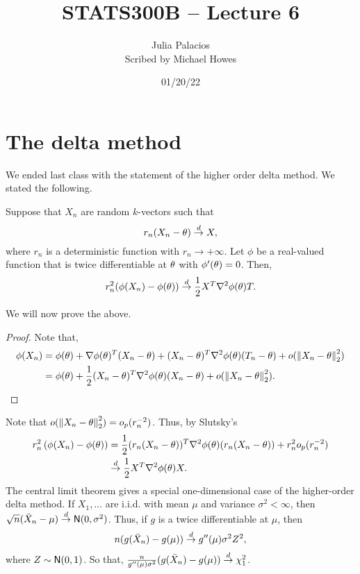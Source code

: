 




\title{STATS300B -- Lecture 6}
\author{Julia Palacios\\ Scribed by Michael Howes}
\date{01/20/22}

\pagestyle{fancy}
\fancyhf{}


\maketitle
\tableofcontents
\section{The delta method}
We ended last class with the statement of the higher order delta method. We stated the following.
\begin{theorem}
    Suppose that $X_n$ are random $k$-vectors such that 
    \[r_n(X_n-{\theta}) \stackrel{d}{\to} X, \]
    where $r_n$ is a deterministic function with $r_n \to +\infty$. Let $\phi$ be a real-valued function that is twice differentiable at ${\theta}$ with $\phi'({\theta})=0$. Then,
    \[r_n^2(\phi(X_n)-\phi({\theta})) \stackrel{d}{\to} \frac{1}{2}X^T\nabla^2\phi({\theta})T.\]
\end{theorem}
We will now prove the above.
\begin{proof}
    Note that,
    \begin{align*}
        \phi(X_n) &=\phi({\theta})+\nabla \phi({\theta})^T(X_n-{\theta}) + (X_n-{\theta})^T\nabla^2 \phi({\theta})(T_n-{\theta})+o(\left\|X_n-{\theta}\right\|_2^2)\\
        &=\phi({\theta}) + \frac{1}{2}(X_n-{\theta})^T\nabla^2 \phi({\theta})(X_n-{\theta})+o(\left\|X_n-{\theta}\right\|_2^2).
    \end{align*}
\end{proof}
Note that $o(\left\|X_n-{\theta}\right\|_2^2) = o_p(r_n^{-2})$. Thus, by Slutsky's
\begin{align*}
    r_n^2\left(\phi(X_n)-\phi({\theta})\right)&=\frac{1}{2}(r_n(X_n-{\theta}))^T\nabla^2 \phi({\theta})(r_n(X_n-{\theta}))+r_n^2o_p(r_n^{-2})\\
    &\stackrel{d}{\to}  \frac{1}{2}X^T\nabla^2 \phi({\theta}) X.\qedhere 
\end{align*}
The central limit theorem gives a special one-dimensional case of the higher-order delta method. If $X_1,\ldots$ are i.i.d. with mean $\mu$ and variance $\sigma^2 < \infty$, then $\sqrt{n}(\bar{X}_n-\mu) \stackrel{d}{\to} \mathsf{N}(0,\sigma^2)$. Thus, if $g$ is a twice differentiable at $\mu$, then 
\[n(g(\bar{X}_n)-g(\mu)) \stackrel{d}{\to} g''(\mu)\sigma^2 Z^2, \]
where $Z \sim \mathsf{N}(0,1)$. So that, $\frac{n}{g''(\mu)\sigma^2}(g(\bar{X}_n)-g(\mu)) \stackrel{d}{\to} \chi^2_1$.

